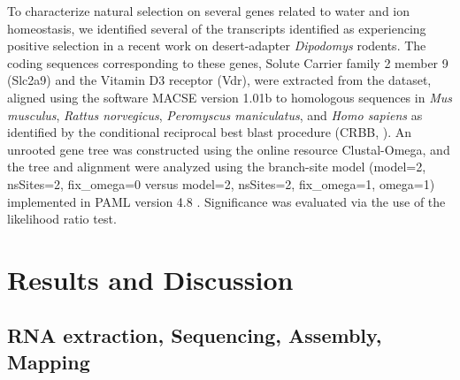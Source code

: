 \documentclass[11pt]{article}
\begin{document}
To characterize natural selection on several genes related to water and ion homeostasis, we identified several of the transcripts identified as experiencing positive selection in a recent work on desert-adapter \textit{Dipodomys} rodents. The coding sequences corresponding to these genes, Solute Carrier family 2 member 9  (Slc2a9) and the Vitamin D3 receptor (Vdr), were extracted from the dataset, aligned using the software MACSE version 1.01b\cite{Ranwez:2011kj} to homologous sequences in \textit{Mus musculus}, \textit{Rattus norvegicus}, \textit{Peromyscus maniculatus}, and \textit{Homo sapiens} as identified by the conditional reciprocal best blast procedure (CRBB, \cite{Aubry:2014en}). An unrooted gene tree was constructed using the online resource Clustal-Omega, and the tree and alignment were analyzed using the branch-site model (model=2, nsSites=2, fix\_omega=0 versus model=2, nsSites=2, fix\_omega=1, omega=1)  implemented in PAML version 4.8 \cite{Yang:2011bm,Yang:2007ki}. Significance was evaluated via the use of the likelihood ratio test. \\   


\section*{Results and Discussion}

\subsection*{RNA extraction, Sequencing, Assembly, Mapping}
\end{document}
